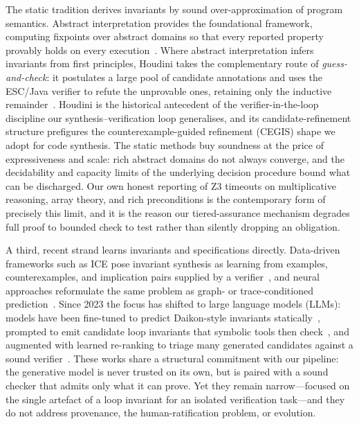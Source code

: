 The static tradition derives invariants by sound over-approximation of program semantics. Abstract interpretation provides the foundational framework, computing fixpoints over abstract domains so that every reported property provably holds on every execution~\cite{cousot1977abstract}. Where abstract interpretation infers invariants from first principles, Houdini takes the complementary route of \emph{guess-and-check}: it postulates a large pool of candidate annotations and uses the ESC/Java verifier to refute the unprovable ones, retaining only the inductive remainder~\cite{flanagan2001houdini}. Houdini is the historical antecedent of the verifier-in-the-loop discipline our synthesis--verification loop generalises, and its candidate-refinement structure prefigures the counterexample-guided refinement (CEGIS) shape we adopt for code synthesis. The static methods buy soundness at the price of expressiveness and scale: rich abstract domains do not always converge, and the decidability and capacity limits of the underlying decision procedure bound what can be discharged. Our own honest reporting of Z3 timeouts on multiplicative reasoning, array theory, and rich preconditions is the contemporary form of precisely this limit, and it is the reason our tiered-assurance mechanism degrades full proof to bounded check to test rather than silently dropping an obligation.

A third, recent strand learns invariants and specifications directly. Data-driven frameworks such as ICE pose invariant synthesis as learning from examples, counterexamples, and implication pairs supplied by a verifier~\cite{garg2014ice}, and neural approaches reformulate the same problem as graph- or trace-conditioned prediction~\cite{si2018learning}. Since 2023 the focus has shifted to large language models (LLMs): models have been fine-tuned to predict Daikon-style invariants statically~\cite{pei2023llminvariants}, prompted to emit candidate loop invariants that symbolic tools then check~\cite{kamath2023loopy}, and augmented with learned re-ranking to triage many generated candidates against a sound verifier~\cite{chakraborty2023ranking}. These works share a structural commitment with our pipeline: the generative model is never trusted on its own, but is paired with a sound checker that admits only what it can prove. Yet they remain narrow---focused on the single artefact of a loop invariant for an isolated verification task---and they do not address provenance, the human-ratification problem, or evolution.

